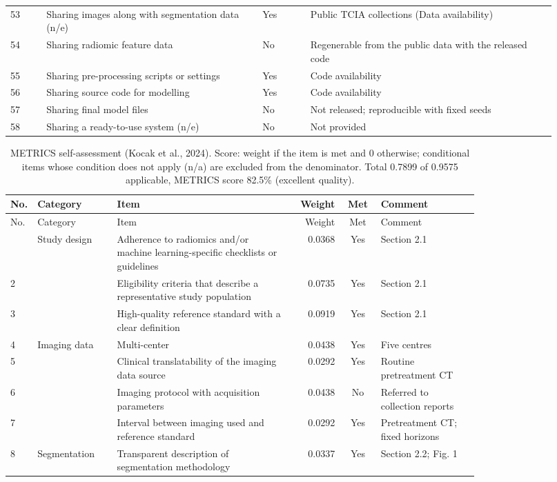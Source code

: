 \begin{longtable}{@{}L{0.06\linewidth}L{0.36\linewidth}L{0.08\linewidth}L{0.415\linewidth}@{}}
53 & Sharing images along with segmentation data (n/e) & Yes & Public TCIA collections (Data availability) \\
54 & Sharing radiomic feature data & No & Regenerable from the public data with the released code \\
55 & Sharing pre-processing scripts or settings & Yes & Code availability \\
56 & Sharing source code for modelling & Yes & Code availability \\
57 & Sharing final model files & No & Not released; reproducible with fixed seeds \\
58 & Sharing a ready-to-use system (n/e) & No & Not provided \\
\end{longtable}

\begin{longtable}{@{}L{0.04\linewidth}L{0.17\linewidth}L{0.37\linewidth}rcL{0.21\linewidth}@{}}
\caption{METRICS self-assessment (Kocak et al., 2024). Score: weight if the item is met and 0 otherwise; conditional items whose condition does not apply (n/a) are excluded from the denominator. Total 0.7899 of 0.9575 applicable, METRICS score 82.5\% (excellent quality).}\label{tab:metrics}\\
\toprule
No. & Category & Item & Weight & Met & Comment \\
\midrule
\endfirsthead
\toprule
No. & Category & Item & Weight & Met & Comment \\
\midrule
\endhead
\bottomrule
{} & Study design & Adherence to radiomics and/or machine learning-specific checklists or guidelines & 0.0368 & Yes & Section 2.1 \\
2 &  & Eligibility criteria that describe a representative study population & 0.0735 & Yes & Section 2.1 \\
3 &  & High-quality reference standard with a clear definition & 0.0919 & Yes & Section 2.1 \\
4 & Imaging data & Multi-center & 0.0438 & Yes & Five centres \\
5 &  & Clinical translatability of the imaging data source & 0.0292 & Yes & Routine pretreatment CT \\
6 &  & Imaging protocol with acquisition parameters & 0.0438 & No & Referred to collection reports \\
7 &  & Interval between imaging used and reference standard & 0.0292 & Yes & Pretreatment CT; fixed horizons \\
8 & Segmentation & Transparent description of segmentation methodology & 0.0337 & Yes & Section 2.2; Fig. 1 \\

\end{longtable}
